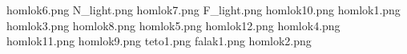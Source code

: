 homlok6.png
N_light.png
homlok7.png
F_light.png
homlok10.png
homlok1.png
homlok3.png
homlok8.png
homlok5.png
homlok12.png
homlok4.png
homlok11.png
homlok9.png
teto1.png
falak1.png
homlok2.png
